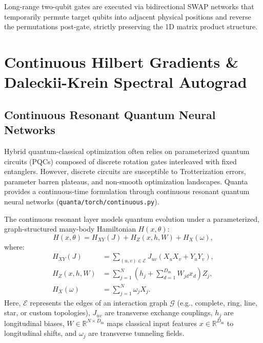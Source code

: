 \documentclass[aps,prx,twocolumn,superscriptaddress,nofootinbib]{revtex4-2}
\begin{document}
Long-range two-qubit gates are executed via bidirectional SWAP networks that temporarily permute target qubits into adjacent physical positions and reverse the permutations post-gate, strictly preserving the 1D matrix product structure.

\section{Continuous Hilbert Gradients \& Daleckii-Krein Spectral Autograd}
\label{sec:continuous_autograd}

\subsection{Continuous Resonant Quantum Neural Networks}
\label{subsec:continuous_layer}

Hybrid quantum-classical optimization often relies on parameterized quantum circuits (PQCs) composed of discrete rotation gates interleaved with fixed entanglers. However, discrete circuits are susceptible to Trotterization errors, parameter barren plateaus, and non-smooth optimization landscapes. Quanta provides a continuous-time formulation through continuous resonant quantum neural networks (\texttt{quanta/torch/continuous.py}).

The continuous resonant layer models quantum evolution under a parameterized, graph-structured many-body Hamiltonian $H(x, \theta)$:
\begin{equation}
    H(x, \theta) = H_{XY}(J) + H_Z(x, h, W) + H_X(\omega),
\end{equation}
where:
\begin{align}
    H_{XY}(J) &= \sum_{(u, v) \in \mathcal{E}} J_{uv} (X_u X_v + Y_u Y_v), \\
    H_Z(x, h, W) &= \sum_{j=1}^N \left( h_j + \sum_{d=1}^{D_{\text{in}}} W_{jd} x_d \right) Z_j, \\
    H_X(\omega) &= \sum_{j=1}^N \omega_j X_j.
\end{align}
Here, $\mathcal{E}$ represents the edges of an interaction graph $\mathcal{G}$ (e.g., complete, ring, line, star, or custom topologies), $J_{uv}$ are transverse exchange couplings, $h_j$ are longitudinal biases, $W \in \mathbb{R}^{N \times D_{\text{in}}}$ maps classical input features $x \in \mathbb{R}^{D_{\text{in}}}$ to longitudinal shifts, and $\omega_j$ are transverse tunneling fields.
\end{document}
